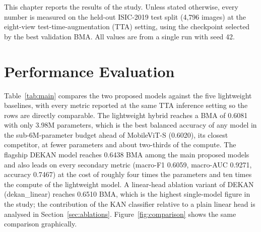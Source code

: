 This chapter reports the results of the study. Unless stated otherwise, every
number is measured on the held-out ISIC-2019 test split (4{,}796 images) at the
eight-view test-time-augmentation (TTA) setting, using the checkpoint selected by
the best validation BMA. All values are from a single run with seed 42.

\section{Performance Evaluation}

Table~\ref{tab:main} compares the two proposed models against the five
lightweight baselines, with every metric reported at the same TTA inference
setting so the rows are directly comparable. The lightweight hybrid reaches a BMA
of 0.6081 with only 3.98M parameters, which is the best balanced accuracy of any
model in the sub-6M-parameter budget ahead of MobileViT-S (0.6020), its
closest competitor, at fewer parameters and about two-thirds of the compute.
The flagship DEKAN model reaches 0.6438 BMA among the main proposed models and
also leads on every secondary metric (macro-F1 0.6059, macro-AUC 0.9271,
accuracy 0.7467) at the cost of roughly four times the parameters and ten times
the compute of the lightweight model. A linear-head ablation variant of DEKAN
(dekan\_linear) reaches 0.6510 BMA, which is the highest single-model figure in
the study; the contribution of the KAN classifier relative to a plain linear head
is analysed in Section~\ref{sec:ablations}. Figure~\ref{fig:comparison} shows
the same comparison graphically.

